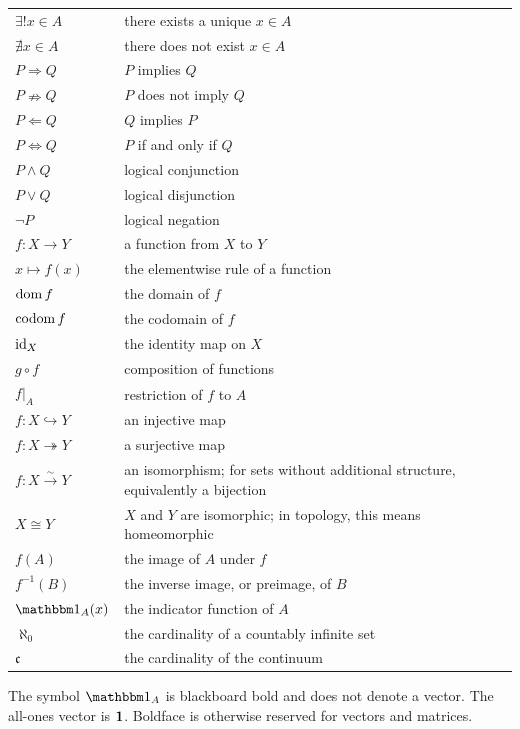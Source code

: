 {\begin{longtable}{@{}L{0.27\textwidth}L{0.65\textwidth}@{}}
        $\exists!x\in A$ & there exists a unique $x\in A$ \\
        $\nexists x\in A$ & there does not exist $x\in A$ \\
        $P\Rightarrow Q$ & $P$ implies $Q$ \\
        $P\nRightarrow Q$ & $P$ does not imply $Q$ \\
        $P\Leftarrow Q$ & $Q$ implies $P$ \\
        $P\Leftrightarrow Q$ & $P$ if and only if $Q$ \\
        $P\land Q$ & logical conjunction \\
        $P\lor Q$ & logical disjunction \\
        $\neg P$ & logical negation \\
        $f:X\to Y$ & a function from $X$ to $Y$ \\
        $x\mapsto f(x)$ & the elementwise rule of a function \\
        $\operatorname{dom} f$ & the domain of $f$ \\
        $\operatorname{codom} f$ & the codomain of $f$ \\
        $\operatorname{id}_X$ & the identity map on $X$ \\
        $g\circ f$ & composition of functions \\
        $f|_A$ & restriction of $f$ to $A$ \\
        $f:X\hookrightarrow Y$ & an injective map \\
        $f:X\twoheadrightarrow Y$ & a surjective map \\
        $f:X\xrightarrow{\sim}Y$ & an isomorphism; for sets without additional structure, equivalently a bijection \\
        $X\cong Y$ & $X$ and $Y$ are isomorphic; in topology, this means homeomorphic \\
        $f(A)$ & the image of $A$ under $f$ \\
        $f^{-1}(B)$ & the inverse image, or preimage, of $B$ \\
        $\indicatorbb{A}(x)$ & the indicator function of $A$ \\
        $\aleph_0$ & the cardinality of a countably infinite set \\
        $\mathfrak{c}$ & the cardinality of the continuum \\
    \end{longtable}
    }

    The symbol $\indicatorbb{A}$ is blackboard bold and does not denote a
    vector. The all-ones vector is $\mathbf{1}$. Boldface is otherwise reserved for
    vectors and matrices.

